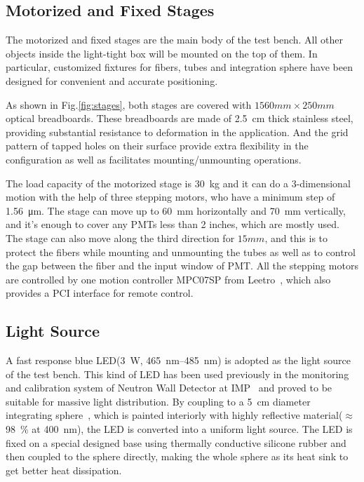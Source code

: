 \documentclass[5p, times]{elsarticle}
\begin{document}
\subsection{Motorized and Fixed Stages}
\label{sec:stages}

The motorized and fixed stages are the main body of the test bench.
All other objects inside the light-tight box will be mounted on the top of them.
In particular, customized fixtures for fibers, tubes and integration sphere have been designed for convenient and accurate positioning.

As shown in Fig.\ref{fig:stages}, both stages are covered with $1560mm\times250mm$ optical breadboards. 
These breadboards are made of \SI{2.5}{cm} thick stainless steel, providing substantial resistance to deformation in the application. And the grid pattern of tapped holes on their surface provide extra flexibility in the configuration as well as facilitates mounting/unmounting operations.

The load capacity of the motorized stage is \SI{30}{\kilo\gram} and it can do a 3-dimensional motion with the help of three stepping motors, who have a minimum step of \SI{1.56}{\micro\meter}.
The stage can move up to \SI{60}{\milli\meter} horizontally and \SI{70}{\milli\meter} vertically, and it's enough to cover any PMTs less than 2 inches, which are mostly used.
The stage can also move along the third direction for $15mm$, and this is to protect the fibers while mounting and unmounting the tubes as well as to control the gap between the fiber and the input window of PMT.
All the stepping motors are controlled by one motion controller MPC07SP from Leetro~\cite{leetro}, which also provides a PCI interface for remote control.

\subsection{Light Source}
\label{sec:light_source}

A fast response blue LED(\SI{3}{\watt}, \SIrange{465}{485}{\nano\meter}) is adopted as the light source of the test bench. This kind of LED has been used previously in the monitoring and calibration system of Neutron Wall Detector at IMP~\cite{yuyuhong_led} and proved to be suitable for massive light distribution. 
By coupling to a \SI{5}{\centi\meter} diameter integrating sphere~\cite{integrating_sphere}, which is painted interiorly with highly reflective material($\approx$\SI{98}{\percent} at \SI{400}{\nano\meter}), the LED is converted into a uniform light source.
The LED is fixed on a special designed base using thermally conductive silicone rubber and then coupled to the sphere directly, making the whole sphere as its heat sink to get better heat dissipation.
\end{document}
